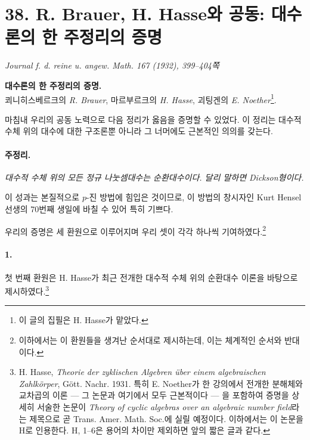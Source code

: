 
\section*{38. R. Brauer, H. Hasse와 공동: 대수론의 한 주정리의 증명}

\begin{center}
\emph{Journal f. d. reine u. angew. Math. 167 (1932), 399--404쪽}
\end{center}

\begin{center}
\textbf{대수론의 한 주정리의 증명.}\\[0.5em]
쾨니히스베르크의 \emph{R. Brauer}, 마르부르크의 \emph{H. Hasse},
괴팅겐의 \emph{E. Noether}\footnote{이 글의 집필은 H. Hasse가 맡았다.}.
\end{center}

마침내 우리의 공동 노력으로 다음 정리가 옳음을 증명할 수 있었다. 이 정리는 대수적 수체 위의 대수에 대한 구조론뿐 아니라 그 너머에도 근본적인 의의를 갖는다.

\paragraph{주정리.}
\emph{대수적 수체 위의 모든 정규 나눗셈대수는 순환대수이다. 달리 말하면 Dickson형이다.}

이 성과는 본질적으로 \(p\)-진 방법에 힘입은 것이므로, 이 방법의 창시자인 Kurt Hensel 선생의 70번째 생일에 바칠 수 있어 특히 기쁘다.

우리의 증명은 세 환원으로 이루어지며 우리 셋이 각각 하나씩 기여하였다.\footnote{이하에서는 이 환원들을 생겨난 순서대로 제시하는데, 이는 체계적인 순서와 반대이다.}

\paragraph{1.}
첫 번째 환원은 H. Hasse가 최근 전개한 대수적 수체 위의 순환대수 이론을 바탕으로 제시하였다.\footnote{H. Hasse, \emph{Theorie der zyklischen Algebren über einem algebraischen Zahlkörper}, Gött. Nachr. 1931. 특히 E. Noether가 한 강의에서 전개한 분해체와 교차곱의 이론 --- 그 논문과 여기에서 모두 근본적이다 --- 을 포함하여 증명을 상세히 서술한 논문이 \emph{Theory of cyclic algebras over an algebraic number field}라는 제목으로 곧 Trans. Amer. Math. Soc.에 실릴 예정이다. 이하에서는 이 논문을 H로 인용한다. H, 1--6은 용어의 차이만 제외하면 앞의 짧은 글과 같다.}

